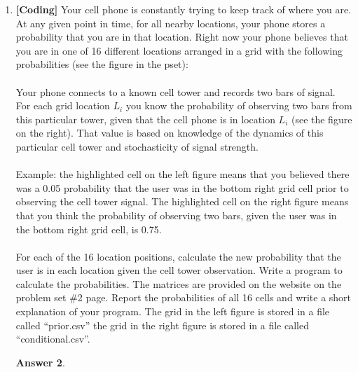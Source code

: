 \documentclass[12pt]{article}
\renewcommand{\(}{\left(}
\renewcommand{\)}{\right)}
\theoremstyle{definition}
\newtheorem*{answer}{Answer}
\begin{document}
\begin{enumerate}
\begin{shaded}
\begin{answer}
    \end{answer}
    \end{shaded}
    \pagebreak
    \item \textbf{[Coding]} Your cell phone is constantly trying to keep track of where you are. At any given point in time, for all nearby locations, your phone stores a probability that you are in that location. Right now your phone believes that you are in one of 16 different locations arranged in a grid with the following probabilities (see the figure in the pset):\\ \\
    Your phone connects to a known cell tower and records two bars of signal. For each grid location $L_i$ you know the probability of observing two bars from this particular tower, given that the cell phone is in location $L_i$ (see the figure on the right). That value is based on knowledge of the dynamics of this particular cell tower and stochasticity of signal strength.\\ \\
    Example: the highlighted cell on the left figure means that you believed there was a 0.05 probability that the user was in the bottom right grid cell prior to observing the cell tower signal. The highlighted cell on the right figure means that you think the probability of observing two bars, given the user was in the bottom right grid cell, is 0.75.\\ \\
    For each of the 16 location positions, calculate the new probability that the user is in each location given the cell tower observation. Write a program to calculate the probabilities. The matrices are provided on the website on the problem set \#2 page. Report the probabilities of all 16 cells and write a short explanation of your program. The grid in the left figure is stored in a file called ``prior.csv'' the grid in the right figure is stored in a file called ``conditional.csv''.
    
    \begin{shaded}
    \begin{answer}
    

\end{answer}
\end{shaded}
\end{enumerate}
\end{document}
